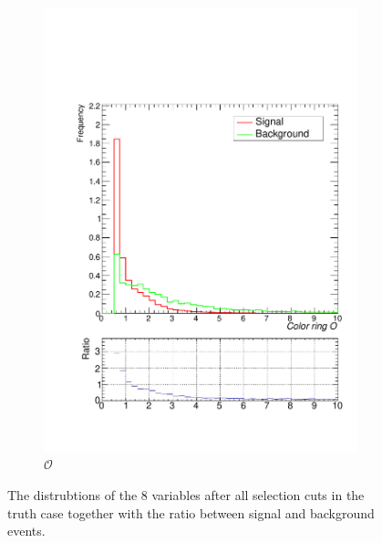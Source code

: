 \documentclass[10pt,a4paper]{book}
\begin{document}
\begin{figure}
\begin{subfigure}{.5\textwidth}
\includegraphics[scale=0.25]{truth/cr}
\caption{$\mathcal{O}$}
\end{subfigure}
\caption{The distrubtions of the 8 variables after all selection cuts in the truth case together with the ratio between signal and background events.}
\label{sgn/bkg true}
\end{figure}
\end{document}
